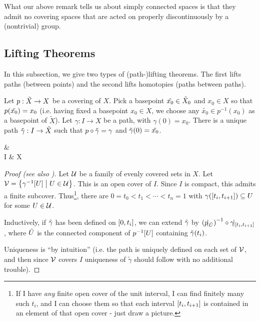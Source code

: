 What our above remark tells us about simply connected spaces is that they admit no covering spaces that are acted on properly discontinuously by a (nontrivial) group.

\subsection{Lifting Theorems}

In this subsection, we give two types of (path-)lifting theorems. The first lifts paths (between points) and the second lifts homotopies (paths between paths).

\begin{boxtheorem}
    Let $p : \Tilde{X} \to X$ be a covering of $X$. Pick a basepoint $\Tilde{x_0} \in \Tilde{X}_0$ and $x_0 \in X$ so that $p\!\left( \Tilde{x_0} \right) = x_0$ (i.e. having fixed a basepoint $x_0\in X$, we choose any $\tilde{x_0}\in p^{-1}(x_0)$ as a basepoint of $\tilde{X}$). Let $\gamma : I \to X$ be a path, with $\gamma(0) = x_0$. There is a unique path $\Tilde{\gamma} : I \to \Tilde{X}$ such that $p \circ \Tilde{\gamma} = \gamma$ and $\Tilde{\gamma}\!\left( 0 \right) = \tilde{x_0}$.
    \begin{cd*}
        &  \arrow[d, "p"] \\[1em]
        I  \arrow[r, "\gamma"'] & X
    \end{cd*}
\end{boxtheorem}
\begin{proof}[Proof (see also \sorry)]
    Let $\mathcal{U}$ be a family of evenly covered sets in $X$. Let $\mathcal{V} = \left\{ \gamma^{-1}[U] \; \middle\vert \; U \in \mathcal{U} \right\}$. This is an open cover of $I$. Since $I$ is compact, this admits a finite subcover. Thus\footnote{If I have \textit{any} finite open cover of the unit interval, I can find finitely many such $t_i$, and I can choose them so that each interval $\left[ t_i, t_{i + 1} \right]$ is contained in an element of that open cover - just draw a picture.}, there are $0 = t_0 < t_1 < \cdots < t_n = 1$ with $\gamma\!\left( \left[ t_i, t_{i + 1} \right] \right) \subseteq U$ for some $U \in \mathcal{U}$.

    Inductively, if $\Tilde{\gamma}$ has been defined on $\left[ 0, t_i \right]$, we can extend $\Tilde{\gamma}$ by $\left( p\!\vert_{\Tilde{U}} \right)^{-1} \circ \gamma\!\vert_{\left[ t_i, t_{i + 1} \right]}$, where $\Tilde{U}$ is the connected component of $p^{-1}[U]$ containing $\Tilde{\gamma}\!\left( t_i \right)$.

    Uniqueness is ``by intuition'' (i.e. the path is uniquely defined on each set of $\mathcal{V}$, and then since $\mathcal{V}$ covers $I$ uniqueness of $\tilde{\gamma}$ should follow with no additional trouble).
\end{proof}

